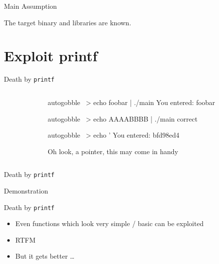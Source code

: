\documentclass[beamer]{uibk}
\begin{document}
\begin{frame}{Main Assumption}
   \begin{center}
       The target binary and libraries are known.
   \end{center}
\end{frame}

\section{Exploit printf}

\begin{frame}[fragile]{Death by \texttt{printf}}
    \begin{columns}
        \begin{column}{0.5\textwidth}
        \end{column}
        \begin{column}{0.5\textwidth}
            \pause
            \begin{pre*}{autogobble}
                ~> echo foobar | ./main
                You entered:
                foobar
            \end{pre*}
            \bigskip\pause
            \begin{pre*}{autogobble}
                ~> echo AAAABBBB | ./main
                correct
            \end{pre*}
            \bigskip\pause
            \begin{pre*} {autogobble}
                ~> echo '%
                You entered:
                bfd98ed4
            \end{pre*}
            \medskip
            Oh look, a pointer, this may come in handy
        \end{column}
    \end{columns}
\end{frame}

\begin{frame}{Death by \texttt{printf}}
    \begin{center}
        \huge Demonstration
    \end{center}
\end{frame}

\begin{frame}{Death by \texttt{printf}}
    \begin{itemize}
        \item Even functions which look very simple / basic can be exploited
        \bigskip
        \item RTFM
        \bigskip
        \pause
        \item But it gets better \dots
    \end{itemize}
\end{frame}
\end{document}
